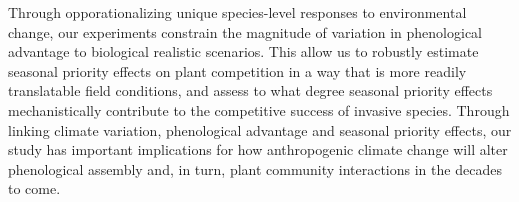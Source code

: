 \documentclass{article}[11pt]
\begin{document}
Through opporationalizing unique species-level responses to environmental change, our experiments constrain the magnitude of variation in phenological advantage to biological realistic scenarios. This allow us to robustly estimate seasonal priority effects on plant competition in a way that is more readily translatable field conditions, and assess to what degree seasonal priority effects mechanistically contribute to the competitive success of invasive species. Through linking climate variation, phenological advantage and seasonal priority effects, our study has important implications for how anthropogenic climate change will alter phenological assembly and, in turn, plant community interactions in the decades to come.
\end{document}
